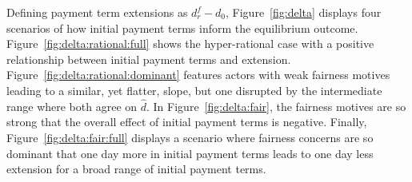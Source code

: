 \documentclass[a4paper,11pt]{article}
\newcommand{\dref}{\widehat d}
\renewcommand{\~}[1]{\tilde{#1}}
\renewcommand{\-}[1]{\overline{#1}}
\begin{document}
Defining payment term extensions as $d^{f}_r-d_0$, Figure~\ref{fig:delta} displays four scenarios of how initial payment terms inform the equilibrium outcome. Figure~\ref{fig:delta:rational:full} shows the hyper-rational case with a  positive relationship between initial payment terms and extension. Figure~\ref{fig:delta:rational:dominant} features actors with weak fairness motives leading to a similar, yet flatter, slope, but one disrupted by the intermediate range where both agree on $\dref$. In Figure~\ref{fig:delta:fair}, the fairness motives are so strong that the overall effect of initial payment terms is negative. Finally, Figure~\ref{fig:delta:fair:full} displays a scenario where fairness concerns are so dominant that one day more in initial payment terms leads to one day less extension for a broad range of initial payment terms.
\end{document}

